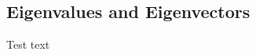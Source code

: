 \documentclass[../../AlgebraQualSolutions.tex]{subfiles}
\begin{document}
\subsection{Eigenvalues and Eigenvectors}
Test text
\end{document}
